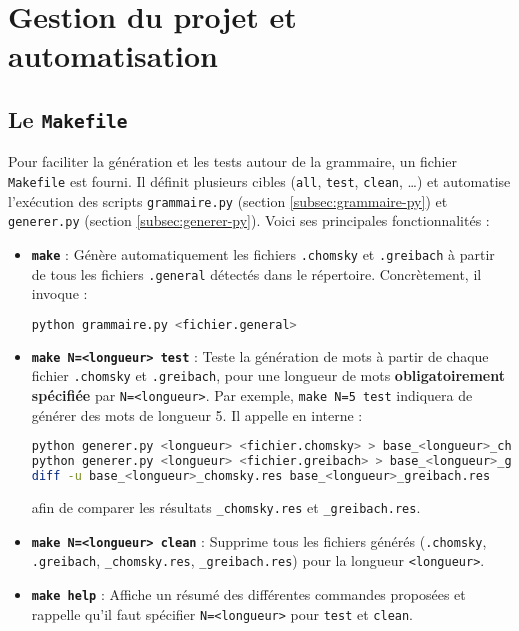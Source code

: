 \documentclass[a4paper,12pt]{article}
\begin{document}
\section{Gestion du projet et automatisation}
\label{sec:makefile-req}

\subsection{Le \texttt{Makefile}}
\label{subsec:makefile}

Pour faciliter la génération et les tests autour de la grammaire, un fichier \texttt{Makefile} est fourni. Il définit plusieurs cibles (\texttt{all}, \texttt{test}, \texttt{clean}, \ldots) et automatise l’exécution des scripts \texttt{grammaire.py} (section \ref{subsec:grammaire-py}) et \texttt{generer.py} (section \ref{subsec:generer-py}). Voici ses principales fonctionnalités :

\begin{itemize}
    \item \textbf{\texttt{make}} : Génère automatiquement les fichiers \texttt{.chomsky} et \texttt{.greibach} à partir de tous les fichiers \texttt{.general} détectés dans le répertoire. Concrètement, il invoque :
\begin{lstlisting}[language=bash, caption={Extrait de Makefile pour la cible `all`}, label={lst:make-all}]
python grammaire.py <fichier.general>
\end{lstlisting}

    \item \textbf{\texttt{make N=<longueur> test}} : Teste la génération de mots à partir de chaque fichier \texttt{.chomsky} et \texttt{.greibach}, pour une longueur de mots \textbf{obligatoirement spécifiée} par \texttt{N=<longueur>}.  
    Par exemple, \texttt{make N=5 test} indiquera de générer des mots de longueur 5. Il appelle en interne :
\pagebreak 
\begin{lstlisting}[language=bash, caption={Extrait de Makefile pour la cible `test`}, label={lst:make-test}]
python generer.py <longueur> <fichier.chomsky> > base_<longueur>_chomsky.res
python generer.py <longueur> <fichier.greibach> > base_<longueur>_greibach.res
diff -u base_<longueur>_chomsky.res base_<longueur>_greibach.res
\end{lstlisting}

    afin de comparer les résultats \texttt{\_chomsky.res} et \texttt{\_greibach.res}.

    \item \textbf{\texttt{make N=<longueur> clean}} : Supprime tous les fichiers générés (\texttt{.chomsky}, \texttt{.greibach}, \texttt{\_chomsky.res}, \texttt{\_greibach.res}) pour la longueur \texttt{<longueur>}.

    \item \textbf{\texttt{make help}} : Affiche un résumé des différentes commandes proposées et rappelle qu’il faut spécifier \texttt{N=<longueur>} pour \texttt{test} et \texttt{clean}.
\end{itemize}
\end{document}
